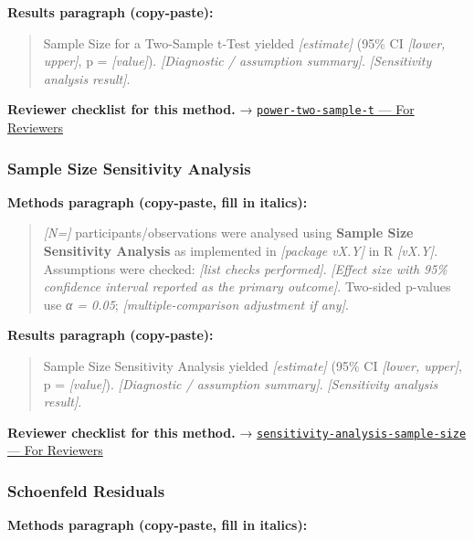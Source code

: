 \documentclass[
]{article}
\begin{document}
\textbf{Results paragraph (copy-paste):}

\begin{quote}
Sample Size for a Two-Sample t-Test yielded \emph{{[}estimate{]}} (95\%
CI \emph{{[}lower, upper{]}}, p = \emph{{[}value{]}}).
\emph{{[}Diagnostic / assumption summary{]}}. \emph{{[}Sensitivity
analysis result{]}}.
\end{quote}

\textbf{Reviewer checklist for this method.} →
\href{../chapters/05-power/power-two-sample-t.Rmd\#for-reviewers}{\texttt{power-two-sample-t}
--- For Reviewers}

\subsubsection{Sample Size Sensitivity
Analysis}\label{sample-size-sensitivity-analysis}

\textbf{Methods paragraph (copy-paste, fill in italics):}

\begin{quote}
\emph{{[}N={]}} participants/observations were analysed using
\textbf{Sample Size Sensitivity Analysis} as implemented in
\emph{{[}package vX.Y{]}} in R \emph{{[}vX.Y{]}}. Assumptions were
checked: \emph{{[}list checks performed{]}}. \emph{{[}Effect size with
95\% confidence interval reported as the primary outcome{]}}. Two-sided
p-values use \emph{α = 0.05}; \emph{{[}multiple-comparison adjustment if
any{]}}.
\end{quote}

\textbf{Results paragraph (copy-paste):}

\begin{quote}
Sample Size Sensitivity Analysis yielded \emph{{[}estimate{]}} (95\% CI
\emph{{[}lower, upper{]}}, p = \emph{{[}value{]}}). \emph{{[}Diagnostic
/ assumption summary{]}}. \emph{{[}Sensitivity analysis result{]}}.
\end{quote}

\textbf{Reviewer checklist for this method.} →
\href{../chapters/05-power/sensitivity-analysis-sample-size.Rmd\#for-reviewers}{\texttt{sensitivity-analysis-sample-size}
--- For Reviewers}

\subsubsection{Schoenfeld Residuals}\label{schoenfeld-residuals}

\textbf{Methods paragraph (copy-paste, fill in italics):}
\end{document}
